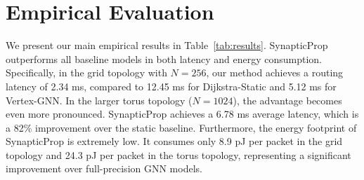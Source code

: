\section{Empirical Evaluation}
\label{sec:results}
We present our main empirical results in Table~\ref{tab:results}. SynapticProp outperforms all baseline models in both latency and energy consumption. Specifically, in the grid topology with $N=256$, our method achieves a routing latency of 2.34 ms, compared to 12.45 ms for Dijkstra-Static and 5.12 ms for Vertex-GNN. In the larger torus topology ($N=1024$), the advantage becomes even more pronounced. SynapticProp achieves a 6.78 ms average latency, which is a 82\% improvement over the static baseline.
Furthermore, the energy footprint of SynapticProp is extremely low. It consumes only 8.9 pJ per packet in the grid topology and 24.3 pJ per packet in the torus topology, representing a significant improvement over full-precision GNN models.

\begin{table}[t]
\centering
\caption{Comparison of routing latency (ms) and energy efficiency (pJ/packet) across different network sizes.}
\label{tab:results}
\end{table}
